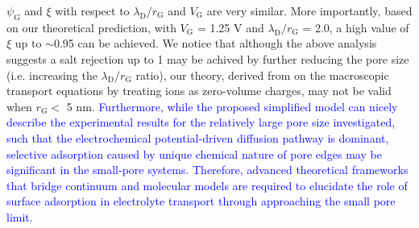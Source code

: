$\psi_{\mathrm{G}}$ and $\xi$ with respect to
$\lambda_{\mathrm{D}}/r_{\mathrm{G}}$ and $V_{\mathrm{G}}$ are very
similar. More importantly, based on our theoretical prediction, with
$V_{\mathrm{G}}$ = 1.25 V and $\lambda_{\mathrm{D}} / r_{\mathrm{G}}$
= { 2.0}, a high value of $\xi$ up to $\sim$0.95 can be achieved.  We
notice that although the above analysis suggests a salt rejection up
to 1 may be achived by further reducing the pore size (i.e. increasing
the $\lambda_{\mathrm{D}}/r_{\mathrm{G}}$ ratio), our theory, derived
from on the macroscopic transport equations by treating ions as
zero-volume charges, may not be valid when $r_{\mathrm{G}}<$ 5
nm\cite{Jain_2015}. \textcolor{blue}{ Furthermore, while the proposed
  simplified model can nicely describe the experimental results for
  the relatively large pore size investigated, such that the
  electrochemical potential-driven diffusion pathway is dominant,
  selective adsorption caused by unique chemical nature of pore edges
  may be significant in the small-pore systems. Therefore, advanced
  theoretical frameworks that bridge continuum and molecular models
  are required to elucidate the role of surface adsorption in
  electrolyte transport through approaching the small pore limit. }





